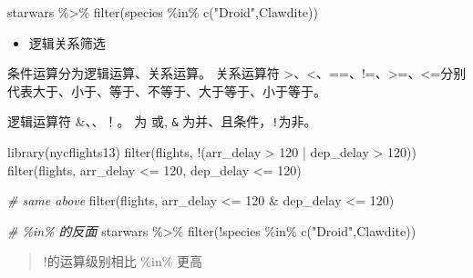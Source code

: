 \documentclass[
]{book}
\newenvironment{Shaded}{\begin{snugshade}}{\end{snugshade}}
\newcommand{\CommentTok}[1]{\textcolor[rgb]{0.56,0.35,0.01}{\textit{#1}}}
\newcommand{\DecValTok}[1]{\textcolor[rgb]{0.00,0.00,0.81}{#1}}
\newcommand{\FunctionTok}[1]{\textcolor[rgb]{0.00,0.00,0.00}{#1}}
\newcommand{\NormalTok}[1]{#1}
\newcommand{\SpecialCharTok}[1]{\textcolor[rgb]{0.00,0.00,0.00}{#1}}
\newcommand{\StringTok}[1]{\textcolor[rgb]{0.31,0.60,0.02}{#1}}
\providecommand{\tightlist}{%
  \setlength{\itemsep}{0pt}\setlength{\parskip}{0pt}}
\begin{document}
\begin{Shaded}
\begin{Highlighting}[]
\NormalTok{starwars }\SpecialCharTok{\%\textgreater{}\%} 
  \FunctionTok{filter}\NormalTok{(species }\SpecialCharTok{\%in\%}  \FunctionTok{c}\NormalTok{(}\StringTok{"Droid"}\NormalTok{,}\StringTok{\textquotesingle{}Clawdite\textquotesingle{}}\NormalTok{))}
\end{Highlighting}
\end{Shaded}

\begin{itemize}
\tightlist
\item
  逻辑关系筛选
\end{itemize}

条件运算分为逻辑运算、关系运算。
关系运算符 \textgreater、\textless、==、!=、\textgreater=、\textless=分别代表大于、小于、等于、不等于、大于等于、小于等于。

逻辑运算符 \&、\textbar、！。 \texttt{\textbar{}}为 或, \texttt{\&} 为并、且条件，\texttt{!}为非。

\begin{Shaded}
\begin{Highlighting}[]
\FunctionTok{library}\NormalTok{(nycflights13)}
\FunctionTok{filter}\NormalTok{(flights, }\SpecialCharTok{!}\NormalTok{(arr\_delay }\SpecialCharTok{\textgreater{}} \DecValTok{120} \SpecialCharTok{|}\NormalTok{ dep\_delay }\SpecialCharTok{\textgreater{}} \DecValTok{120}\NormalTok{))}
\FunctionTok{filter}\NormalTok{(flights, arr\_delay }\SpecialCharTok{\textless{}=} \DecValTok{120}\NormalTok{, dep\_delay }\SpecialCharTok{\textless{}=} \DecValTok{120}\NormalTok{)}

\CommentTok{\# same above}
\FunctionTok{filter}\NormalTok{(flights, arr\_delay }\SpecialCharTok{\textless{}=} \DecValTok{120} \SpecialCharTok{\&}\NormalTok{ dep\_delay }\SpecialCharTok{\textless{}=} \DecValTok{120}\NormalTok{)}

\CommentTok{\# \%in\% 的反面}
\NormalTok{starwars }\SpecialCharTok{\%\textgreater{}\%} 
  \FunctionTok{filter}\NormalTok{(}\SpecialCharTok{!}\NormalTok{species }\SpecialCharTok{\%in\%}  \FunctionTok{c}\NormalTok{(}\StringTok{"Droid"}\NormalTok{,}\StringTok{\textquotesingle{}Clawdite\textquotesingle{}}\NormalTok{))}
\end{Highlighting}
\end{Shaded}

\begin{quote}
!的运算级别相比 \%in\% 更高
\end{quote}
\end{document}
